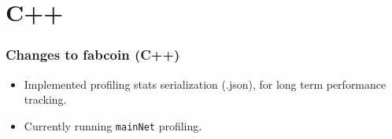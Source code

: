 \section{C++}
\begin{frame}[fragile]
\frametitle{Changes to fabcoin (C++)}
\begin{itemize}
\item Implemented profiling stats serialization (.json), for long term performance tracking.
\item Currently running \verb|mainNet| profiling.
\end{itemize}

\end{frame}